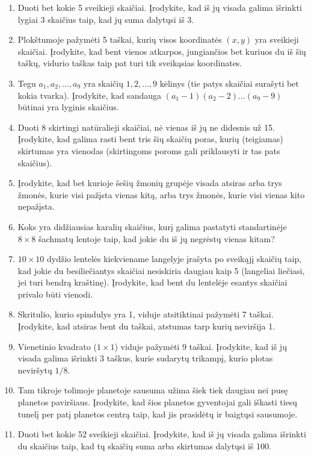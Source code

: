 \documentclass[11pt,a4paper]{scrartcl}
\begin{document}
\begin{enumerate}
    \item Duoti bet kokie 5 sveikieji skaičiai. Įrodykite, kad iš jų visada galima išrinkti lygiai 3 skaičius taip, kad jų suma dalytųsi iš 3.
    \item Plokštumoje pažymėti 5 taškai, kurių visos koordinatės $(x, y)$ yra sveikieji skaičiai. Įrodykite, kad bent vienos atkarpos, jungiančios bet kuriuos du iš šių taškų, vidurio taškas taip pat turi tik sveikąsias koordinates.
    \item Tegu $a_1, a_2, \dots, a_9$ yra skaičių $1, 2, \dots, 9$ kėlinys (tie patys skaičiai surašyti bet kokia tvarka). Įrodykite, kad sandauga $(a_1-1)(a_2-2)\dots(a_9-9)$ būtinai yra lyginis skaičius.
    \item Duoti 8 skirtingi natūralieji skaičiai, nė vienas iš jų ne didesnis už 15. Įrodykite, kad galima rasti bent tris šių skaičių poras, kurių (teigiamas) skirtumas yra vienodas (skirtingoms poroms gali priklausyti ir tas pats skaičius).
    \item Įrodykite, kad bet kurioje šešių žmonių grupėje visada atsiras arba trys žmonės, kurie visi pažįsta vienas kitą, arba trys žmonės, kurie visi vienas kito nepažįsta.
    \item Koks yra didžiausias karalių skaičius, kurį galima pastatyti standartinėje $8\times8$ šachmatų lentoje taip, kad jokie du iš jų negrėstų vienas kitam?
    \item $10\times10$ dydžio lentelės kiekviename langelyje įrašyta po sveikąjį skaičių taip, kad jokie du besiliečiantys skaičiai nesiskiria daugiau kaip 5 (langeliai liečiasi, jei turi bendrą kraštinę). Įrodykite, kad bent du lentelėje esantys skaičiai privalo būti vienodi.
    \item Skritulio, kurio spindulys yra 1, viduje atsitiktinai pažymėti 7 taškai. Įrodykite, kad atsiras bent du taškai, atstumas tarp kurių neviršija 1.
    \item Vienetinio kvadrato ($1 \times 1$) viduje pažymėti 9 taškai. Įrodykite, kad iš jų visada galima išrinkti 3 taškus, kurie sudarytų trikampį, kurio plotas neviršytų $1/8$.
    \item Tam tikroje tolimoje planetoje sausuma užima šiek tiek daugiau nei pusę planetos paviršiaus. Įrodykite, kad šios planetos gyventojai gali iškasti tiesų tunelį per patį planetos centrą taip, kad jis prasidėtų ir baigtųsi sausumoje.
    \item Duoti bet kokie 52 sveikieji skaičiai. Įrodykite, kad iš jų visada galima išrinkti du skaičius taip, kad tų skaičių suma arba skirtumas dalytųsi iš 100.

\end{enumerate}
\end{document}
